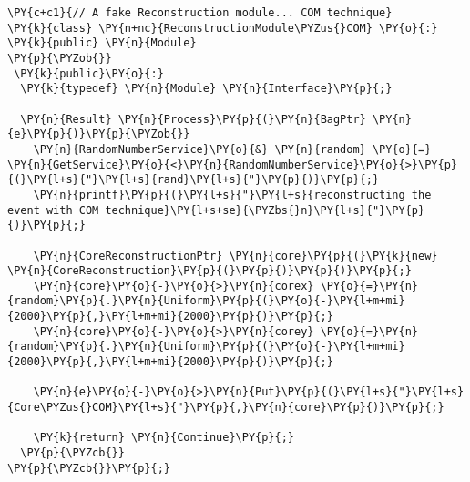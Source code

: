 \begin{Verbatim}[commandchars=\\\{\}]
\PY{c+c1}{// A fake Reconstruction module... COM technique}
\PY{k}{class} \PY{n+nc}{ReconstructionModule\PYZus{}COM} \PY{o}{:} \PY{k}{public} \PY{n}{Module}
\PY{p}{\PYZob{}}
 \PY{k}{public}\PY{o}{:}
  \PY{k}{typedef} \PY{n}{Module} \PY{n}{Interface}\PY{p}{;}

  \PY{n}{Result} \PY{n}{Process}\PY{p}{(}\PY{n}{BagPtr} \PY{n}{e}\PY{p}{)}\PY{p}{\PYZob{}}
    \PY{n}{RandomNumberService}\PY{o}{&} \PY{n}{random} \PY{o}{=} \PY{n}{GetService}\PY{o}{<}\PY{n}{RandomNumberService}\PY{o}{>}\PY{p}{(}\PY{l+s}{"}\PY{l+s}{rand}\PY{l+s}{"}\PY{p}{)}\PY{p}{;} 
    \PY{n}{printf}\PY{p}{(}\PY{l+s}{"}\PY{l+s}{reconstructing the event with COM technique}\PY{l+s+se}{\PYZbs{}n}\PY{l+s}{"}\PY{p}{)}\PY{p}{;} 

    \PY{n}{CoreReconstructionPtr} \PY{n}{core}\PY{p}{(}\PY{k}{new} \PY{n}{CoreReconstruction}\PY{p}{(}\PY{p}{)}\PY{p}{)}\PY{p}{;}
    \PY{n}{core}\PY{o}{-}\PY{o}{>}\PY{n}{corex} \PY{o}{=}\PY{n}{random}\PY{p}{.}\PY{n}{Uniform}\PY{p}{(}\PY{o}{-}\PY{l+m+mi}{2000}\PY{p}{,}\PY{l+m+mi}{2000}\PY{p}{)}\PY{p}{;} 
    \PY{n}{core}\PY{o}{-}\PY{o}{>}\PY{n}{corey} \PY{o}{=}\PY{n}{random}\PY{p}{.}\PY{n}{Uniform}\PY{p}{(}\PY{o}{-}\PY{l+m+mi}{2000}\PY{p}{,}\PY{l+m+mi}{2000}\PY{p}{)}\PY{p}{;} 

    \PY{n}{e}\PY{o}{-}\PY{o}{>}\PY{n}{Put}\PY{p}{(}\PY{l+s}{"}\PY{l+s}{Core\PYZus{}COM}\PY{l+s}{"}\PY{p}{,}\PY{n}{core}\PY{p}{)}\PY{p}{;}
    
    \PY{k}{return} \PY{n}{Continue}\PY{p}{;}
  \PY{p}{\PYZcb{}}
\PY{p}{\PYZcb{}}\PY{p}{;}
\end{Verbatim}
